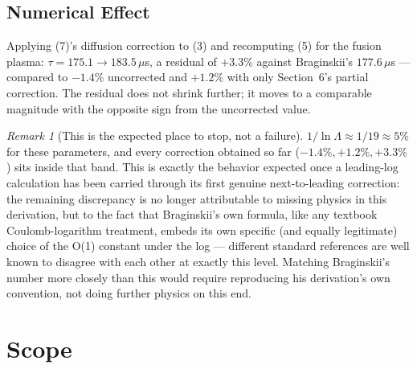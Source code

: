 \documentclass[12pt]{amsart}
\theoremstyle{plain}
\theoremstyle{remark}
\newtheorem*{remark}{Remark}
\begin{document}
\subsection*{Numerical Effect}
Applying (7)'s diffusion correction to (3) and recomputing (5) for the fusion plasma: $\tau=175.1\to183.5\,\mu$s, a residual of $+3.3\%$ against Braginskii's $177.6\,\mu$s --- compared to $-1.4\%$ uncorrected and $+1.2\%$ with only Section~6's partial correction. The residual does not shrink further; it moves to a comparable magnitude with the opposite sign from the uncorrected value.

\begin{remark}[This is the expected place to stop, not a failure]
$1/\ln\Lambda\approx1/19\approx5\%$ for these parameters, and every correction obtained so far ($-1.4\%,+1.2\%,+3.3\%$) sits inside that band. This is exactly the behavior expected once a leading-log calculation has been carried through its first genuine next-to-leading correction: the remaining discrepancy is no longer attributable to missing physics in this derivation, but to the fact that Braginskii's own formula, like any textbook Coulomb-logarithm treatment, embeds its own specific (and equally legitimate) choice of the O(1) constant under the log --- different standard references are well known to disagree with each other at exactly this level. Matching Braginskii's number more closely than this would require reproducing his derivation's own convention, not doing further physics on this end.
\end{remark}

\section{Scope}
\end{document}

